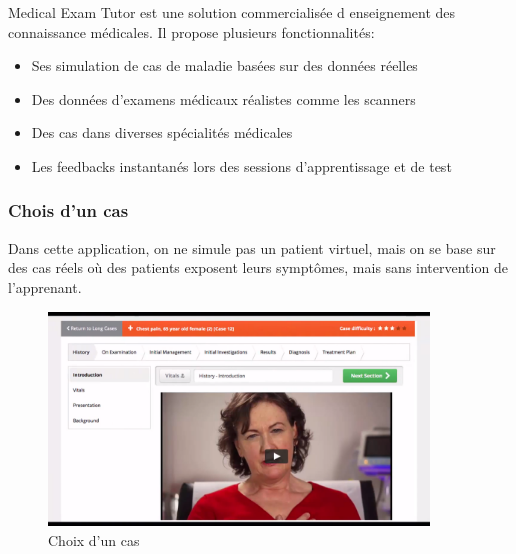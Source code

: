Medical Exam Tutor est une solution commercialisée d enseignement des connaissance médicales. Il propose plusieurs fonctionnalités:

\begin{itemize}
    \item Ses simulation de cas de maladie basées sur des données réelles
    \item Des données d'examens médicaux réalistes comme les scanners
    \item Des cas dans diverses spécialités médicales
    \item Les feedbacks instantanés lors des sessions d'apprentissage et de test
\end{itemize}

\subsubsection{Chois d'un cas}
Dans cette application, on ne simule pas un patient virtuel, mais on se base sur des cas réels où des patients exposent leurs symptômes, mais sans intervention de l'apprenant.
\begin{figure}
    \centering
    \includegraphics[width=0.9\textwidth]{figures/met/case choice.png}
    \captionsetup{justification=centering}
    \caption{Choix d'un cas}
\end{figure}

